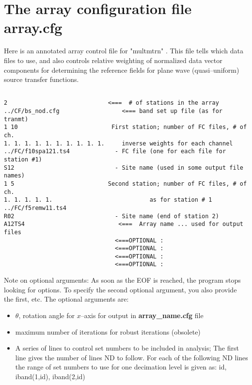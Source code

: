 \section{The array configuration file array.cfg}

Here is an annotated array control file for "multmtrn" .   This file tells which data files to
use, and also controls relative weighting of normalized data vector components for determining
the reference fields for plane wave (quasi--uniform) source transfer functions.

\small
\begin{verbatim}

2                             <===  # of stations in the array
../CF/bs_nod.cfg                  <=== band set up file (as for tranmt)
1 10                           First station; number of FC files, # of ch.
1. 1. 1. 1. 1. 1. 1. 1. 1. 1.     inverse weights for each channel
../FC/f10spa121.ts4             - FC file (one for each file for station #1)
S12                             - Site name (used in some output file names)
1 5                           Second station; number of FC files, # of ch.
1. 1. 1. 1. 1.                            as for station # 1
../FC/f5remw11.ts4
R02                             - Site name (end of station 2)
A12TS4                           <===  Array name ... used for output files
                                <===OPTIONAL : 
                                <===OPTIONAL : 
                                <===OPTIONAL : 
                                <===OPTIONAL : 

\end{verbatim}
\normalsize

\noindent
Note on optional arguments:  As soon as the EOF is reached, the program stops looking
for options.   To specify the second optional argument, you also provide the first, etc.
The optional arguments are: 
\begin{itemize}
\item $\theta$, rotation angle for $x$--axis for output in {\bf array\_name.cfg}
file
\item maximum number of iterations for robust iterations (obsolete)
\item A series of lines to control set numbers to be included in analysis;
     The first line gives the number of lines ND to follow.  For each of the
     following ND lines the range of set numbers to use for one decimation
     level is given as: id, iband(1,id), iband(2,id)
\end{itemize}
 
